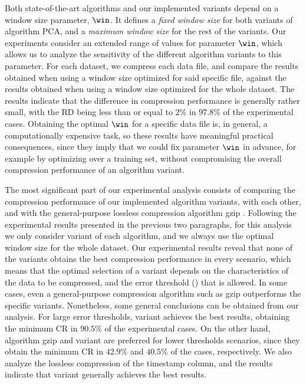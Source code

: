 Both state-of-the-art algorithms and our implemented variants depend on a window size parameter, $\win$. It defines a \textit{fixed window size} for both variants of algorithm PCA, and a \textit{maximum window size} for the rest of the variants. Our experiments consider an extended range of values for parameter $\win$, which allows us to analyze the sensitivity of the different algorithm variants to this parameter. For each dataset, we compress each data file, and compare the results obtained when using a window size optimized for said specific file, against the results obtained when using a window size optimized for the whole dataset. The results indicate that the difference in compression performance is generally rather small, with the RD being less than or equal to $2\%$ in $97.8\%$ of the experimental cases. Obtaining the optimal $\win$ for a specific data file is, in general, a computationally expensive task, so these results have meaningful practical consequences, since they imply that we could fix parameter $\win$ in advance, for example by optimizing over a training set, without compromising the overall compression performance of an algorithm variant. 


The most significant part of our experimental analysis consists of comparing the compression performance of our implemented algorithm variants, with each other, and with the general-purpose lossless compression algorithm gzip \cite{gzip}. Following the experimental results presented in the previous two paragraphs, for this analysis we only consider variant \maskalgo of each algorithm, and we always use the optimal window size for the whole dataset. Our experimental results reveal that none of the variants obtains the best compression performance in every scenario, which means that the optimal selection of a variant depends on the characteristics of the data to be compressed, and the error threshold (\maxerror) that is allowed. In some cases, even a general-purpose compression algorithm such as gzip outperforms the specific variants. Nonetheless, some general conclusions can be obtained from our analysis. For large error thresholds, variant  achieves the best results, obtaining the minimum CR in $90.5\%$ of the experimental cases. On the other hand, algorithm gzip and variant  are preferred for lower thresholds scenarios, since they obtain the minimum CR in $42.9\%$ and $40.5\%$ of the cases, respectively. We also analyze the lossless compression of the timestamp column, and the results indicate that variant  generally achieves the best results.



